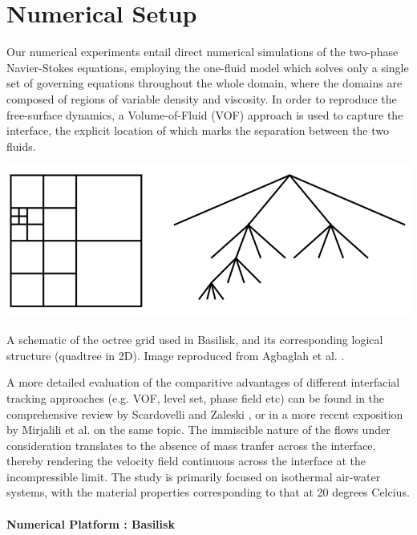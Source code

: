 \section{Numerical Setup}
Our numerical experiments entail direct numerical simulations of the two-phase
Navier-Stokes equations, employing the one-fluid model which  
solves only a single set of governing equations throughout the whole domain,
where the domains are composed of regions of variable density and viscosity. 
In order to reproduce the free-surface dynamics, a Volume-of-Fluid 
(VOF) approach is used to capture the interface, the explicit location 
of which marks the separation between the two fluids.


\begin{marginfigure}
\centering
\includegraphics{plots/ligament_breakup/octree.png}
\caption{A schematic of the octree grid used in Basilisk, and its
	corresponding logical structure (quadtree in 2D).
	Image reproduced from Agbaglah et al. \cite{agbag}.
	}
\label{octree}
\end{marginfigure}


A more detailed evaluation of the comparitive advantages of different  
interfacial tracking approaches (e.g. VOF, level set, phase field etc) 
can be found in the comprehensive review by Scardovelli and Zaleski 
\cite{zaleskiannual}, or in a more recent exposition by  
Mirjalili et al. \cite{mirjalili2017interface} on the same topic.
The immiscible nature of the flows under consideration translates to the 
absence of mass tranfer across the interface, thereby rendering the 
velocity field continuous across the interface at the incompressible limit. 
The study is primarily focused on isothermal air-water systems, with 
the material properties corresponding to that at 20 degrees Celcius. 

\paragraph{Numerical Platform : Basilisk}


